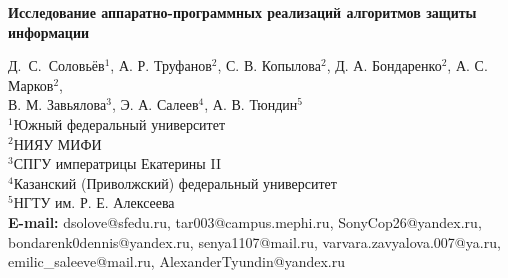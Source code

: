 \documentclass[a4paper,12pt]{article}
\def\titleK#1{\begin{center}{\Large\textbf{#1}}\end{center}}
\def\authorK#1{\begin{center}{#1}\end{center}}
\theoremstyle{definition}
\begin{document}
\titleK{Исследование аппаратно-программных реализаций алгоритмов защиты информации}

\authorK{Д.~С.~Соловьёв$^{1}$, А. Р. Труфанов$^{2}$, С. В. Копылова$^{2}$, Д. А. Бондаренко$^{2}$,  А. С. Марков$^{2}$, 
\\В. М. Завьялова$^{3}$, Э. А. Салеев$^{4}$, А. В. Тюндин$^{5}$
\\$^{1}$Южный федеральный университет 
\\$^{2}$НИЯУ МИФИ
\\$^{3}$СПГУ императрицы Екатерины II
\\$^{4}$Казанский (Приволжский) федеральный университет
\\$^{5}$НГТУ им. Р. Е. Алексеева
\\{\bf E-mail:} dsolove@sfedu.ru, tar003@campus.mephi.ru,  SonyCop26@yandex.ru, bondarenk0dennis@yandex.ru, senya1107@mail.ru, varvara.zavyalova.007@ya.ru,  emilic\_saleeve@mail.ru, AlexanderTyundin@yandex.ru}

\begin{abstract}
В РАБОТЕ\\
Актуальность может быть вынесена в аннотацию как вариант, но попробуем добавить свою аннотация\\
{\bf Актуальность:} Проект направлен на изучение методов реализаций широко распространенных алгоритмов криптографической защиты информации; изучение алгоритмов защиты от статического и динамического анализа, а также на развитие у исследователя нестандартного подхода к анализу надежности механизмов защиты.
\\
{\bf Ключевые слова:} \textit{проверка надежности системы защиты исполняемого кода, статический и динамический анализ, информационная безопасность.} 
\end{abstract}
\end{document}

